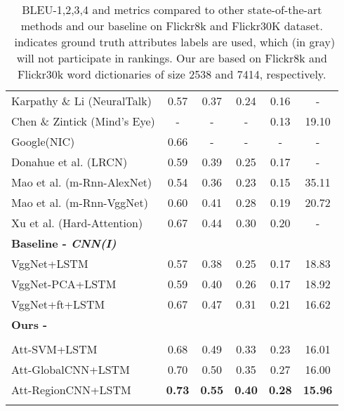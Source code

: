 \documentclass[10pt,journal,compsoc]{IEEEtran}
\begin{document}
\begin{table}[t]
\begin{center}
{\begin{tabular}{l c c c c|c }
    Karpathy \& Li (NeuralTalk) \cite{Karpathy2014deepvs}& 0.57 & 0.37 & 0.24 & 0.16 & - \\
    Chen \& Zintick (Mind's Eye) \cite{Chen2015CVPRMind}& -&-&-&0.13&19.10 \\
    Google(NIC) \cite{vinyals2014show}& 0.66 & - & - &-&- \\
    Donahue et al. (LRCN) \cite{donahue2014long}&0.59&0.39&0.25&0.17&- \\
    Mao et al. (m-Rnn-AlexNet) \cite{mao2014deep}&0.54&0.36&0.23&0.15&35.11 \\
    Mao et al. (m-Rnn-VggNet) \cite{mao2014deep}&0.60&0.41&0.28&0.19&20.72 \\
    Xu et al. (Hard-Attention) \cite{xu2015show}&0.67&0.44&0.30&0.20&- \\
    \Xhline{2\arrayrulewidth}
    \textbf{Baseline - \textit{CNN(I)}} & & & & & \\ \hline
    VggNet+LSTM & 0.57 & 0.38 & 0.25 & 0.17 & 18.83 \\
    VggNet-PCA+LSTM & 0.59 & 0.40 & 0.26 & 0.17 & 18.92 \\
VggNet+ft+LSTM & 0.67 & 0.47 & 0.31 & 0.21 & 16.62 \\\Xhline{2\arrayrulewidth}
    \textbf{Ours - } & & & & & \\ \hline
\cellcolor[rgb]{0.7,0.7,0.7}{Att-GT+LSTM\textsuperscript{}} & \cellcolor[rgb]{0.7,0.7,0.7}{0.78} & \cellcolor[rgb]{0.7,0.7,0.7}{0.57} & \cellcolor[rgb]{0.7,0.7,0.7}{0.42} & \cellcolor[rgb]{0.7,0.7,0.7}{0.30} & \cellcolor[rgb]{0.7,0.7,0.7}{14.88} \\
Att-SVM+LSTM & 0.68 & 0.49 & 0.33 &0.23 & 16.01 \\
    Att-GlobalCNN+LSTM&0.70&0.50&0.35&0.27&16.00\\
    Att-RegionCNN+LSTM & \textbf{0.73} & \textbf{0.55} & \textbf{0.40} & \textbf{0.28} & \textbf{15.96}\\
    \Xhline{2\arrayrulewidth}
  \end{tabular}}
\end{center}
  \vspace{-5pt}
 \caption{BLEU-1,2,3,4 and  metrics compared to other state-of-the-art methods and our baseline on Flickr8k and Flickr30K dataset. ~indicates ground truth attributes labels are used, which (in \colorbox[rgb]{0.7,0.7,0.7}{gray}) will not participate in rankings. Our  are based on Flickr8k and Flickr30k word dictionaries of size 2538 and 7414, respectively.}
 \vspace{-10pt}
\label{tab1} 
\end{table}
\end{document}
